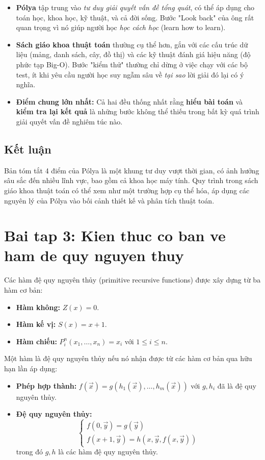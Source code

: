 \documentclass[12pt,a4paper]{article}
\begin{document}
\begin{itemize}
    \item \textbf{Pólya} tập trung vào \textit{tư duy giải quyết vấn đề tổng quát}, có thể áp dụng cho toán học, khoa học, kỹ thuật, và cả đời sống. Bước "Look back" của ông rất quan trọng vì nó giúp người học \textit{học cách học} (learn how to learn).
    
    \item \textbf{Sách giáo khoa thuật toán} thường cụ thể hơn, gắn với các cấu trúc dữ liệu (mảng, danh sách, cây, đồ thị) và các kỹ thuật đánh giá hiệu năng (độ phức tạp Big-O). Bước "kiểm thử" thường chỉ dừng ở việc chạy với các bộ test, ít khi yêu cầu người học suy ngẫm sâu về \textit{tại sao} lời giải đó lại có ý nghĩa.
    
    \item \textbf{Điểm chung lớn nhất:} Cả hai đều thống nhất rằng \textbf{hiểu bài toán} và \textbf{kiểm tra lại kết quả} là những bước không thể thiếu trong bất kỳ quá trình giải quyết vấn đề nghiêm túc nào.
\end{itemize}

\subsection*{Kết luận}
Bản tóm tắt 4 điểm của Pólya là một khung tư duy vượt thời gian, có ảnh hưởng sâu sắc đến nhiều lĩnh vực, bao gồm cả khoa học máy tính. Quy trình trong sách giáo khoa thuật toán có thể xem như một trường hợp cụ thể hóa, áp dụng các nguyên lý của Pólya vào bối cảnh thiết kế và phân tích thuật toán.



\section*{Bai tap 3: Kien thuc co ban ve ham de quy nguyen thuy}

Các hàm đệ quy nguyên thủy (primitive recursive functions) được xây dựng từ ba hàm cơ bản:
\begin{itemize}
    \item \textbf{Hàm không:} $Z(x) = 0$.
    \item \textbf{Hàm kế vị:} $S(x) = x + 1$.
    \item \textbf{Hàm chiếu:} $P_i^n(x_1, \dots, x_n) = x_i$ với $1 \le i \le n$.
\end{itemize}

Một hàm là đệ quy nguyên thủy nếu nó nhận được từ các hàm cơ bản qua hữu hạn lần áp dụng:
\begin{itemize}
    \item \textbf{Phép hợp thành:} $f(\vec{x}) = g(h_1(\vec{x}), \dots, h_m(\vec{x}))$ với $g, h_i$ đã là đệ quy nguyên thủy.
    \item \textbf{Đệ quy nguyên thủy:}
    \[
    \begin{cases}
    f(0, \vec{y}) = g(\vec{y}) \\
    f(x+1, \vec{y}) = h(x, \vec{y}, f(x, \vec{y}))
    \end{cases}
    \]
    trong đó $g, h$ là các hàm đệ quy nguyên thủy.
\end{itemize}
\end{document}
